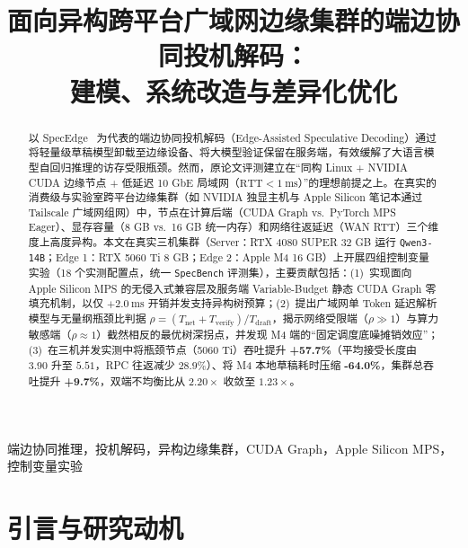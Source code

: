 \documentclass[conference]{IEEEtran}
\begin{document}
\title{面向异构跨平台广域网边缘集群的端边协同投机解码：\\建模、系统改造与差异化优化}

\author{%
}

\maketitle

\begin{abstract}
以 SpecEdge~\cite{park2025specedge} 为代表的端边协同投机解码（Edge-Assisted Speculative Decoding）通过将轻量级草稿模型卸载至边缘设备、将大模型验证保留在服务端，有效缓解了大语言模型自回归推理的访存受限瓶颈。然而，原论文评测建立在``同构 Linux + NVIDIA CUDA 边缘节点 + 低延迟 10 GbE 局域网（$\text{RTT} < 1\ \text{ms}$）''的理想前提之上。在真实的消费级与实验室跨平台边缘集群（如 NVIDIA 独显主机与 Apple Silicon 笔记本通过 Tailscale 广域网组网）中，节点在计算后端（CUDA Graph vs.\ PyTorch MPS Eager）、显存容量（8 GB vs.\ 16 GB 统一内存）和网络往返延迟（WAN RTT）三个维度上高度异构。本文在真实三机集群（Server：RTX 4080 SUPER 32 GB 运行 \texttt{Qwen3-14B}；Edge 1：RTX 5060 Ti 8 GB；Edge 2：Apple M4 16 GB）上开展四组控制变量实验（18 个实测配置点，统一 \texttt{SpecBench} 评测集），主要贡献包括：(1)~实现面向 Apple Silicon MPS 的无侵入式兼容层及服务端 Variable-Budget 静态 CUDA Graph 零填充机制，以仅 $+2.0\ \text{ms}$ 开销并发支持异构树预算；(2)~提出广域网单 Token 延迟解析模型与无量纲瓶颈比判据 $\rho = (T_{\text{net}} + T_{\text{verify}}) / T_{\text{draft}}$，揭示网络受限端（$\rho \gg 1$）与算力敏感端（$\rho \approx 1$）截然相反的最优树深拐点，并发现 M4 端的``固定调度底噪摊销效应''；(3)~在三机并发实测中将瓶颈节点（5060 Ti）吞吐提升 \textbf{+57.7\%}（平均接受长度由 $3.90$ 升至 $5.51$，RPC 往返减少 $28.9\%$）、将 M4 本地草稿耗时压缩 \textbf{-64.0\%}，集群总吞吐提升 \textbf{+9.7\%}，双端不均衡比从 $2.20\times$ 收敛至 $1.23\times$。
\end{abstract}

\begin{IEEEkeywords}
端边协同推理，投机解码，异构边缘集群，CUDA Graph，Apple Silicon MPS，控制变量实验
\end{IEEEkeywords}

\section{引言与研究动机}
\end{document}
